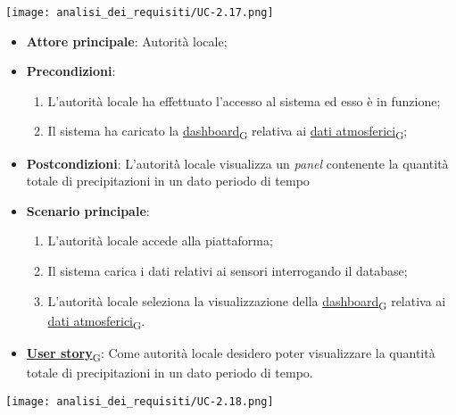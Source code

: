 \begin{center}
	\texttt{[image: analisi\_dei\_requisiti/UC-2.17.png]}
\end{center}

\begin{itemize}
	\item \textbf{Attore principale}: Autorità locale;
	\item \textbf{Precondizioni}:
	      \begin{enumerate}
		      \item L'autorità locale ha effettuato l'accesso al sistema ed esso è in funzione;
		      \item Il sistema ha caricato la \href{https://7last.github.io/docs/rtb/documentazione-interna/glossario\#dashboard}{dashboard\textsubscript{G}} relativa ai \href{https://7last.github.io/docs/rtb/documentazione-interna/glossario\#dati-atmosferici}{dati atmosferici\textsubscript{G}};
	      \end{enumerate}
	\item \textbf{Postcondizioni}: L'autorità locale visualizza un \textit{panel} contenente la quantità totale di precipitazioni in un dato periodo di tempo
	\item \textbf{Scenario principale}:
	      \begin{enumerate}
		      \item L'autorità locale accede alla piattaforma;
		      \item Il sistema carica i dati relativi ai sensori interrogando il database;
		      \item L'autorità locale seleziona la visualizzazione della \href{https://7last.github.io/docs/rtb/documentazione-interna/glossario\#dashboard}{dashboard\textsubscript{G}} relativa ai \href{https://7last.github.io/docs/rtb/documentazione-interna/glossario\#dati-atmosferici}{dati atmosferici\textsubscript{G}}.
	      \end{enumerate}
	\item \href{https://7last.github.io/docs/rtb/documentazione-interna/glossario\#user-story}{\textbf{User story}\textsubscript{G}}: Come autorità locale desidero poter visualizzare la quantità totale di precipitazioni in un dato periodo di tempo.
\end{itemize}

\begin{center}
	\texttt{[image: analisi\_dei\_requisiti/UC-2.18.png]}
\end{center}

